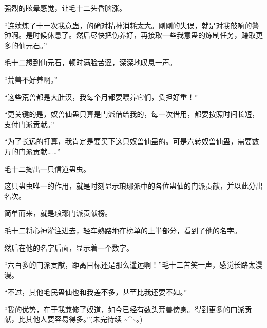 \begin{this_body}
强烈的眩晕感觉，让毛十二头昏脑涨。

“连续炼了十一次我意蛊，的确对精神消耗太大。刚刚的失误，就是对我敲响的警钟啊。是时候休息了。然后尽快把伤养好，再接取一些我意蛊的炼制任务，赚取更多的仙元石。”

毛十二想到仙元石，顿时满脸苦涩，深深地叹息一声。

“荒兽不好养啊。”

“这些荒兽都是大肚汉，我每个月都要喂养它们，负担好重！”

“更关键的是，奴兽仙蛊只算是门派借给我的，每一次借用，都要按照时间长短，支付门派贡献。”

“为了长远的打算，我肯定是要买下这只奴兽仙蛊的。可是六转奴兽仙蛊，需要数万的门派贡献……”

毛十二掏出一只信道蛊虫。

这只蛊虫唯一的作用，就是时刻显示琅琊派中的各位蛊仙的门派贡献，并以此分出名次。

简单而来，就是琅琊门派贡献榜。

毛十二将心神灌注进去，轻车熟路地在榜单的上半部分，看到了他的名字。

然后在他的名字后面，显示着一个数字。

“六百多的门派贡献，距离目标还是那么遥远啊！”毛十二苦笑一声，感觉长路太漫漫。

“不过，其他毛民蛊仙也和我差不多，甚至比我还要不如。”

“我的优势，在于我兼修了奴道，如今已经有数头荒兽傍身。得到更多的门派贡献，比其他人要容易得多。”(未完待续 \~{}\^{}\~{}。)

\end{this_body}

